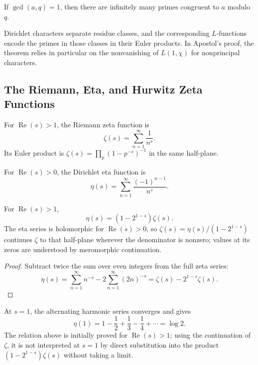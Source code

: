 \begin{theorem}
If $\gcd(a,q)=1$, then there are infinitely many primes congruent to $a$ modulo $q$.
\end{theorem}

Dirichlet characters separate residue classes, and the corresponding $L$-functions encode the primes in those classes in their Euler products. In Apostol's proof, the theorem relies in particular on the nonvanishing of $L(1,\chi)$ for nonprincipal characters.

\subsection{The Riemann, Eta, and Hurwitz Zeta Functions}

\begin{definition}
For $\operatorname{Re}(s)>1$, the Riemann zeta function is
\[
 \zeta(s)=\sum_{n=1}^{\infty}\frac{1}{n^s}.
\]
Its Euler product is $\zeta(s)=\prod_p(1-p^{-s})^{-1}$ in the same half-plane.
\end{definition}

\begin{definition}
For $\operatorname{Re}(s)>0$, the Dirichlet eta function is
\[
 \eta(s)=\sum_{n=1}^{\infty}\frac{(-1)^{n-1}}{n^s}.
\]
\end{definition}

\begin{proposition}
For $\operatorname{Re}(s)>1$,
\[
 \eta(s)=\left(1-2^{1-s}\right)\zeta(s).
\]
The eta series is holomorphic for $\operatorname{Re}(s)>0$, so $\zeta(s)=\eta(s)/(1-2^{1-s})$ continues $\zeta$ to that half-plane wherever the denominator is nonzero; values at its zeros are understood by meromorphic continuation.
\end{proposition}

\begin{proof}
Subtract twice the sum over even integers from the full zeta series:
\[
 \eta(s)=\sum_{n=1}^{\infty}n^{-s}-2\sum_{n=1}^{\infty}(2n)^{-s}
 =\zeta(s)-2^{1-s}\zeta(s).
\]
\end{proof}

\begin{example}
At $s=1$, the alternating harmonic series converges and gives
\[
 \eta(1)=1-\frac12+\frac13-\frac14+\cdots=\log2.
\]
The relation above is initially proved for $\operatorname{Re}(s)>1$; using the continuation of $\zeta$, it is not interpreted at $s=1$ by direct substitution into the product $\left(1-2^{1-s}\right)\zeta(s)$ without taking a limit.
\end{example}


